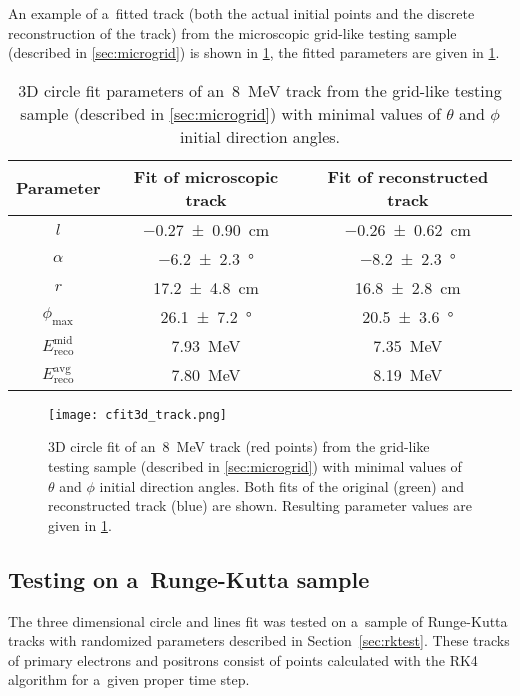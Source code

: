 			An example of a~fitted track (both the actual initial points and the discrete reconstruction of the track) from the microscopic grid-like testing sample (described in \cref{sec:microgrid}) is shown in \cref{fig:cfit3d}, the fitted parameters are given in \cref{tab:cfit3d}.
			
			
			\begin{table}
				\centering
				{\renewcommand{\arraystretch}{1.2}
					\begin{tabular}{|c|c|c|}
						\hline
						\textbf{Parameter} & \textbf{Fit of microscopic track} & \textbf{Fit of reconstructed track} \\
						\hline
						$l$ & \qty{-0.27 \pm 0.90}{\cm} & \qty{-0.26 \pm 0.62}{\cm} \\ \hline
						$\alpha$ & \qty{-6.2 \pm 2.3}{\degree} & \qty{-8.2 \pm 2.3}{\degree} \\ \hline
						$r$ & \qty{17.2 \pm 4.8}{\cm} & \qty{16.8 \pm 2.8}{\cm} \\ \hline
						$\phi_{\text{max}}$ & \qty{26.1 \pm 7.2}{\degree} & \qty{20.5 \pm 3.6}{\degree} \\ \hline
						$E_{\text{reco}}^{\text{mid}}$ & \qty{7.93}{\MeV} & \qty{7.35}{\MeV} \\ \hline
						$E_{\text{reco}}^{\text{avg}}$ & \qty{7.80}{\MeV} & \qty{8.19}{\MeV} \\ \hline
				\end{tabular}}
				\caption{3D circle fit parameters of an~\qty{8}{\MeV} track from the grid-like testing sample (described in \cref{sec:microgrid}) with minimal values of $\theta$ and $\phi$ initial direction angles.}
				\label{tab:cfit3d}
			\end{table}
			
			\begin{figure}
				\centering
				\texttt{[image: cfit3d\_track.png]}
				\caption{3D circle fit of an~\qty{8}{\MeV} track (red points) from the grid-like testing sample (described in \cref{sec:microgrid}) with minimal values of $\theta$ and $\phi$ initial direction angles. Both fits of the original (green) and reconstructed track (blue) are shown. Resulting parameter values are given in \cref{tab:cfit3d}.}
				\label{fig:cfit3d}
			\end{figure}			
			
			\subsection{Testing on a~Runge-Kutta sample}
				The three dimensional circle and lines fit was tested on a~sample of Runge-Kutta tracks with randomized parameters described in Section~\ref{sec:rktest}. These tracks of primary electrons and positrons consist of points calculated with the \ac{RK4} algorithm for a~given proper time step.
	
